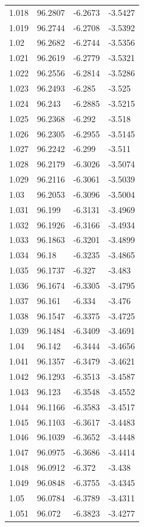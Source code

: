 \begin{tabular}{llll}
1.018 & 96.2807 & -6.2673 & -3.5427 \\
1.019 & 96.2744 & -6.2708 & -3.5392 \\
1.02 & 96.2682 & -6.2744 & -3.5356 \\
1.021 & 96.2619 & -6.2779 & -3.5321 \\
1.022 & 96.2556 & -6.2814 & -3.5286 \\
1.023 & 96.2493 & -6.285 & -3.525 \\
1.024 & 96.243 & -6.2885 & -3.5215 \\
1.025 & 96.2368 & -6.292 & -3.518 \\
1.026 & 96.2305 & -6.2955 & -3.5145 \\
1.027 & 96.2242 & -6.299 & -3.511 \\
1.028 & 96.2179 & -6.3026 & -3.5074 \\
1.029 & 96.2116 & -6.3061 & -3.5039 \\
1.03 & 96.2053 & -6.3096 & -3.5004 \\
1.031 & 96.199 & -6.3131 & -3.4969 \\
1.032 & 96.1926 & -6.3166 & -3.4934 \\
1.033 & 96.1863 & -6.3201 & -3.4899 \\
1.034 & 96.18 & -6.3235 & -3.4865 \\
1.035 & 96.1737 & -6.327 & -3.483 \\
1.036 & 96.1674 & -6.3305 & -3.4795 \\
1.037 & 96.161 & -6.334 & -3.476 \\
1.038 & 96.1547 & -6.3375 & -3.4725 \\
1.039 & 96.1484 & -6.3409 & -3.4691 \\
1.04 & 96.142 & -6.3444 & -3.4656 \\
1.041 & 96.1357 & -6.3479 & -3.4621 \\
1.042 & 96.1293 & -6.3513 & -3.4587 \\
1.043 & 96.123 & -6.3548 & -3.4552 \\
1.044 & 96.1166 & -6.3583 & -3.4517 \\
1.045 & 96.1103 & -6.3617 & -3.4483 \\
1.046 & 96.1039 & -6.3652 & -3.4448 \\
1.047 & 96.0975 & -6.3686 & -3.4414 \\
1.048 & 96.0912 & -6.372 & -3.438 \\
1.049 & 96.0848 & -6.3755 & -3.4345 \\
1.05 & 96.0784 & -6.3789 & -3.4311 \\
1.051 & 96.072 & -6.3823 & -3.4277 \\

\end{tabular}
